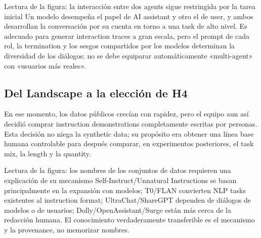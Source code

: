 
\begin{knowledgebox}{Lectura de la figura: la interacción entre dos agents sigue restringida por la tarea inicial}
Un modelo desempeña el papel de AI assistant y otro el de user, y ambos desarrollan la conversación por su cuenta en torno a una task de alto nivel. Es adecuado para generar interaction traces a gran escala, pero el prompt de cada rol, la termination y los sesgos compartidos por los modelos determinan la diversidad de los diálogos; no se debe equiparar automáticamente «multi-agent» con «usuarios más reales».
\end{knowledgebox}


\subsection{Del Landscape a la elección de H4}

En ese momento, los datos públicos crecían con rapidez, pero el equipo aun así decidió comprar instruction demonstrations completamente escritas por personas. Esta decisión no niega la synthetic data; su propósito era obtener una línea base humana controlable para después comparar, en experimentos posteriores, el task mix, la length y la quantity.


\begin{knowledgebox}{Lectura de la figura: los nombres de los conjuntos de datos requieren una explicación de su mecanismo}
Self-Instruct/Unnatural Instructions se basan principalmente en la expansión con modelos; T0/FLAN convierten NLP tasks existentes al instruction format; UltraChat/ShareGPT dependen de diálogos de modelos o de usuarios; Dolly/OpenAssistant/Surge están más cerca de la redacción humana. El conocimiento verdaderamente transferible es el mecanismo y la provenance, no memorizar nombres.
\end{knowledgebox}

